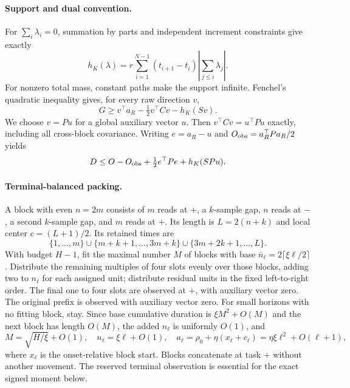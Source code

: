 \documentclass[11pt]{article}
\begin{document}
\paragraph{Support and dual convention.}
For $\sum_i\lambda_i=0$, summation by parts and independent increment
constraints give exactly
\begin{equation}\label{eq:support}
 h_K(\lambda)=r\sum_{i=1}^{N-1}(t_{i+1}-t_i)
 \left|\sum_{j\le i}\lambda_j\right|.
\end{equation}
For nonzero total mass, constant paths make the support infinite.
Fenchel's quadratic inequality gives, for every raw direction $v$,
\begin{equation}\label{eq:dual}
 G\ge v^\top a_R-\tfrac12v^\top Cv-h_K(Sv).
\end{equation}
We choose $v=Pu$ for a global auxiliary vector $u$. Then
$v^\top Cv=u^\top Pu$ exactly, including all cross-block covariance.
Writing $e=a_R-u$ and $O_{\rm obs}=a_R^\top Pa_R/2$ yields
\begin{equation}\label{eq:deficit}
 D\le O-O_{\rm obs}+\tfrac12e^\top Pe+h_K(SPu).
\end{equation}

\paragraph{Terminal-balanced packing.}
A block with even $n=2m$ consists of $m$ reads at $+$, a $k$-sample gap,
$n$ reads at $-$, a second $k$-sample gap, and $m$ reads at $+$.
Its length is $L=2(n+k)$ and local center $c=(L+1)/2$.
Its retained times are
\[
 \{1,\ldots,m\}\cup\{m+k+1,\ldots,3m+k\}
 \cup\{3m+2k+1,\ldots,L\}.
\]
With budget $H-1$, fit the maximal number $M$ of blocks with base
$\bar n_\ell=2\lceil\xi\ell/2\rceil$.
Distribute the remaining multiples of four slots evenly over those blocks,
adding two to $n_\ell$ for each assigned unit; distribute residual units in
the fixed left-to-right order. The final one to four slots are observed at
$+$, with auxiliary vector zero. The original prefix is observed with
auxiliary vector zero. For small horizons with no fitting block, stay.
Since base cumulative duration is $\xi M^2+O(M)$ and the next block has
length $O(M)$, the added $n_\ell$ is uniformly $O(1)$, and
\begin{equation}\label{eq:scales}
 M=\sqrt{H/\xi}+O(1),\quad n_\ell=\xi\ell+O(1),\quad
 a_\ell=\rho_0+\eta(x_\ell+c_\ell)=\eta\xi\ell^2+O(\ell+1),
\end{equation}
where $x_\ell$ is the onset-relative block start. Blocks concatenate at task
$+$ without another movement. The reserved terminal observation is essential
for the exact signed moment below.
\end{document}
